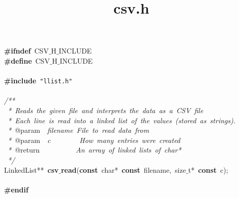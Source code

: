 \documentclass{article}
\title{csv.h}
\date{}
\begin{document}
\maketitle

\noindent
\mbox{}\textbf{\#ifndef}\ CSV$\_$H$\_$INCLUDE \\
\mbox{}\textbf{\#define}\ CSV$\_$H$\_$INCLUDE \\
\mbox{} \\
\mbox{}\textbf{\#include}\ \texttt{"{}llist.h"{}} \\
\mbox{} \\
\mbox{}\textit{/**} \\
\mbox{}\textit{\ *\ Reads\ the\ given\ file\ and\ interprets\ the\ data\ as\ a\ CSV\ file} \\
\mbox{}\textit{\ *\ Each\ line\ is\ read\ into\ a\ linked\ list\ of\ the\ values\ (stored\ as\ strings).} \\
\mbox{}\textit{\ *\ }@param\textit{\ \ filename\ File\ to\ read\ data\ from} \\
\mbox{}\textit{\ *\ }@param\textit{\ \ c\ \ \ \ \ \ \ \ How\ many\ entries\ were\ created} \\
\mbox{}\textit{\ *\ }@return\textit{\ \ \ \ \ \ \ \ \ \ An\ array\ of\ linked\ lists\ of\ char*} \\
\mbox{}\textit{\ */} \\
\mbox{}LinkedList**\ \textbf{csv$\_$read}(\textbf{const}\ char*\ \textbf{const}\ filename,\ size$\_$t*\ \textbf{const}\ c); \\
\mbox{} \\
\mbox{}\textbf{\#endif} \\
\mbox{}
\end{document}
